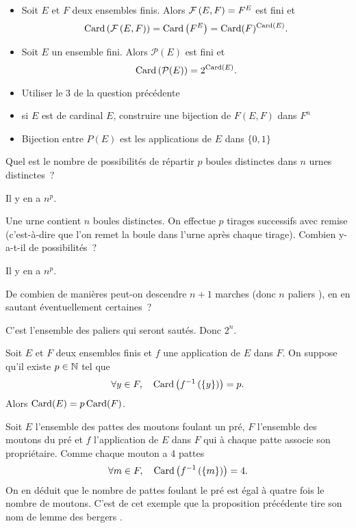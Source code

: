 \documentclass{magnolia}
\begin{document}
\begin{proposition}
\begin{itemize}
\item Soit $E$ et $F$ deux ensembles finis. Alors $\mathcal{F}\left(E,F\right)=F^E$ est fini et
  \[\operatorname{Card}\left(\mathcal{F}\left(E,F\right)\right)=\operatorname{Card}\left(F^E\right)=\operatorname{Card}(F)^{\operatorname{Card}(E)}.\]
\item Soit $E$ un ensemble fini. Alors $\mathcal{P}(E)$ est fini et
  \[\operatorname{Card}\left(\mathcal{P}(E)\right)=2^{\operatorname{Card}(E)}.\]
\end{itemize}
\end{proposition}

\begin{preuve}
\begin{itemize}
\item Utiliser le 3 de la question précédente
\item si $E$ est de cardinal $E$, construire une bijection de $F(E,F)$ dans $F^n$
\item Bijection entre $P(E)$ est les applications de $E$ dans $\{0,1\}$
\end{itemize}
\end{preuve}

\begin{exoUnique}
\exo Quel est le nombre de possibilités de répartir $p$ boules distinctes
  dans $n$ urnes distinctes~?
  \begin{sol}
  Il y en a $n^p$.
  \end{sol}
\exo Une urne contient $n$ boules distinctes. On effectue $p$ tirages
  successifs avec remise (c'est-à-dire que l'on remet la boule dans l'urne
  après chaque tirage). Combien y-a-t-il de possibilités~?
  \begin{sol}
  Il y en a $n^p$.
  \end{sol}
\exo De combien de manières peut-on descendre $n+1$ marches (donc $n$
  \og paliers \fg), en en sautant éventuellement certaines~?
  \begin{sol}
  C'est l'ensemble des paliers qui seront sautés. Donc $2^n$.
  \end{sol}
\end{exoUnique}

\begin{proposition}[nom={Lemme des bergers}]
Soit $E$ et $F$ deux ensembles finis et $f$ une application de $E$ dans $F$. On
suppose qu'il existe $p\in\mathbb{N}$ tel que
\[\forall y\in F ,\quad \operatorname{Card}\left(f^{-1}\left(\left\{y\right\}\right)\right)=p.\]
Alors $\operatorname{Card}(E)=p\operatorname{Card}(F)$.
\end{proposition}

\begin{remarqueUnique}
\remarque Soit $E$ l'ensemble des pattes des moutons foulant un pré, $F$
  l'ensemble des moutons du pré et $f$ l'application de $E$ dans $F$ qui à chaque
  patte associe son propriétaire. Comme chaque mouton a 4 pattes
  \[\forall m\in F,\quad \operatorname{Card}\left(f^{-1}\left(\left\{m\right\}\right)\right)=4.\] 
  On en déduit que le nombre de pattes foulant le pré est égal à quatre fois
  le nombre de moutons. C'est de cet exemple que la proposition précédente
  tire son nom de \og lemme des bergers \fg.
\end{remarqueUnique}
\end{document}
